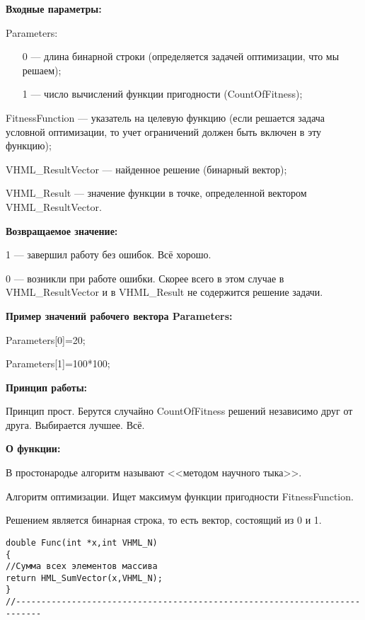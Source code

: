 \textbf{Входные параметры:}

 Parameters:
 
 \begin{itemize}
 \item [0] --- длина бинарной строки (определяется задачей оптимизации, что мы решаем);
 \item [1] --- число вычислений функции пригодности (CountOfFitness);
 \end{itemize}
  
 FitnessFunction --- указатель на целевую функцию (если решается задача условной оптимизации, то учет ограничений должен быть включен в эту функцию);
 
 VHML\_ResultVector --- найденное решение (бинарный вектор);
 
 VHML\_Result --- значение функции в точке, определенной вектором VHML\_ResultVector.

\textbf{Возвращаемое значение:}
 
 1 --- завершил работу без ошибок. Всё хорошо.
 
 0 --- возникли при работе ошибки. Скорее всего в этом случае в VHML\_ResultVector и в VHML\_Result не содержится решение задачи.
 
\textbf{Пример значений рабочего вектора Parameters:}

 Parameters[0]=20;
 
 Parameters[1]=100*100;
 
 \textbf{Принцип работы:}
 
 Принцип прост. Берутся случайно CountOfFitness решений независимо друг от друга. Выбирается лучшее. Всё.
 
 \textbf{ О функции:}
 
 В простонародье алгоритм называют <<методом научного тыка>>.
 
Алгоритм оптимизации. Ищет максимум функции пригодности FitnessFunction.

Решением является бинарная строка, то есть вектор, состоящий из 0 и 1.

\begin{lstlisting}[caption=Оптимизируемая функция]
double Func(int *x,int VHML_N)
{
//Сумма всех элементов массива
return HML_SumVector(x,VHML_N);
}
//---------------------------------------------------------------------------
\end{lstlisting}